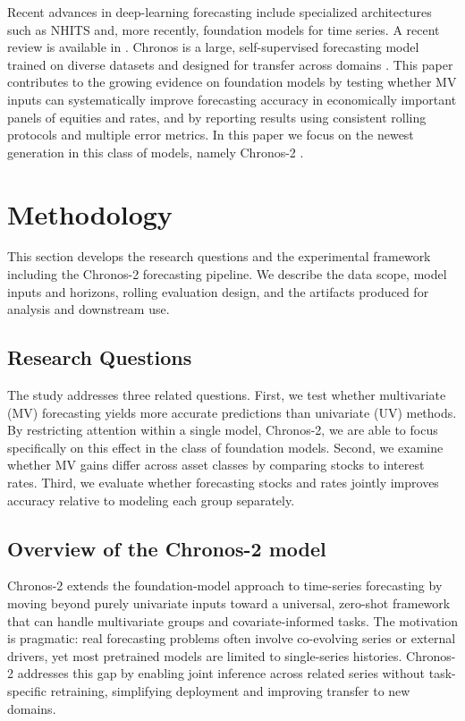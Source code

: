 \documentclass[twocolumn]{article}
\begin{document}
Recent advances in deep-learning forecasting include specialized architectures such as NHITS \citep{challu_nhits_2023} and, more recently, foundation models for time series. A recent review is available in \cite{zhang_review_2026}. Chronos is a large, self-supervised forecasting model trained on diverse datasets and designed for transfer across domains \citep{ansari_chronos_2024}. This paper contributes to the growing evidence on foundation models by testing whether MV inputs can systematically improve forecasting accuracy in economically important panels of equities and rates, and by reporting results using consistent rolling protocols and multiple error metrics. In this paper we focus on the newest generation in this class of models, namely Chronos-2 \citep{ansari_chronos-2_2025}.



\section{Methodology}

This section develops the research questions and the experimental framework including the Chronos-2 forecasting pipeline. We describe the data scope, model inputs and horizons, rolling evaluation design, and the artifacts produced for analysis and downstream use.

\subsection{Research Questions}
The study addresses three related questions. First, we test whether multivariate (MV) forecasting yields more accurate predictions than univariate (UV) methods. By restricting attention within a single model, Chronos-2, we are able to focus specifically on this effect in the class of foundation models. Second, we examine whether MV gains differ across asset classes by comparing stocks to interest rates. Third, we evaluate whether forecasting stocks and rates jointly improves accuracy relative to modeling each group separately. 

\subsection{Overview of the Chronos-2 model}

Chronos-2 \citep{ansari_chronos-2_2025} extends the foundation-model approach to time-series forecasting by moving beyond purely univariate inputs toward a universal, zero-shot framework that can handle multivariate groups and covariate-informed tasks. The motivation is pragmatic: real forecasting problems often involve co-evolving series or external drivers, yet most pretrained models are limited to single-series histories. Chronos-2 addresses this gap by enabling joint inference across related series without task-specific retraining, simplifying deployment and improving transfer to new domains.
\end{document}
